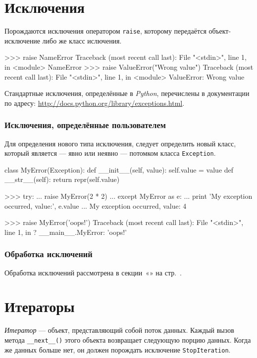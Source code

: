 \section{Исключения}
\label{sec:py-exceptions}

Порождаются исключения оператором \lstinline{raise}, которому передаётся объект-исключение либо же класс ислючения.
\begin{pylst}{}{}
>>> raise NameError
Traceback (most recent call last):
  File "<stdin>", line 1, in <module>
NameError
>>> raise ValueError("Wrong value")
Traceback (most recent call last):
  File "<stdin>", line 1, in <module>
ValueError: Wrong value
\end{pylst}

Стандартные исключения, определённые в \emph{Python}, перечислены в документации по адресу: \url{http://docs.python.org/library/exceptions.html}.

\subsubsection{Исключения, определённые пользователем}
Для определения нового типа исключения, следует определить новый класс, который является — явно или неявно — потомком класса \lstinline{Exception}.
\begin{pylst}{}{}
class MyError(Exception):
    def __init__(self, value):
        self.value = value
    def __str__(self):
        return repr(self.value)

>>> try:
...     raise MyError(2 * 2)
... except MyError as e:
...     print 'My exception occurred, value:', e.value
...
My exception occurred, value: 4

>>> raise MyError('oops!')
Traceback (most recent call last):
  File "<stdin>", line 1, in ?
__main__.MyError: 'oops!'
\end{pylst}

\subsubsection{Обработка исключений}
Обработка исключений рассмотрена в секции~«» на стр.~\pageref{sec:py-try-stmt}.

\section{Итераторы}
\label{sec:py-iterators}

\emph{Итератор} — объект, представляющий собой поток данных. Каждый вызов метода \lstinline{__next__()} этого объекта возвращает следующую порцию данных. Когда же данных больше нет, он должен порождать исключение \lstinline{StopIteration}.

